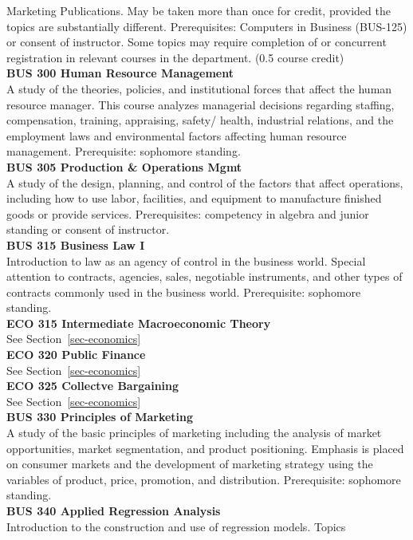 \documentclass[
  letterpaper,
]{scrbook}
\begin{document}
Marketing Publications. May be taken more than once for credit, provided
the topics are substantially different. Prerequisites: Computers in
Business (BUS-125) or consent of instructor. Some topics may require
completion of or concurrent registration in relevant courses in the
department. (0.5 course credit)\\
\textbf{BUS 300 Human Resource Management}\\
A study of the theories, policies, and institutional forces that affect
the human resource manager. This course analyzes managerial decisions
regarding staffing, compensation, training, appraising, safety/ health,
industrial relations, and the employment laws and environmental factors
affecting human resource management. Prerequisite: sophomore standing.\\
\textbf{BUS 305 Production \& Operations Mgmt}\\
A study of the design, planning, and control of the factors that affect
operations, including how to use labor, facilities, and equipment to
manufacture finished goods or provide services. Prerequisites:
competency in algebra and junior standing or consent of instructor.\\
\textbf{BUS 315 Business Law I}\\
Introduction to law as an agency of control in the business world.
Special attention to contracts, agencies, sales, negotiable instruments,
and other types of contracts commonly used in the business world.
Prerequisite: sophomore standing.\\
\textbf{ECO 315 Intermediate Macroeconomic Theory}\\
See Section~\ref{sec-economics}\\
\textbf{ECO 320 Public Finance}\\
See Section~\ref{sec-economics}\\
\textbf{ECO 325 Collectve Bargaining}\\
See Section~\ref{sec-economics}\\
\textbf{BUS 330 Principles of Marketing}\\
A study of the basic principles of marketing including the analysis of
market opportunities, market segmentation, and product positioning.
Emphasis is placed on consumer markets and the development of marketing
strategy using the variables of product, price, promotion, and
distribution. Prerequisite: sophomore standing.\\
\textbf{BUS 340 Applied Regression Analysis}\\
Introduction to the construction and use of regression models. Topics
\end{document}
